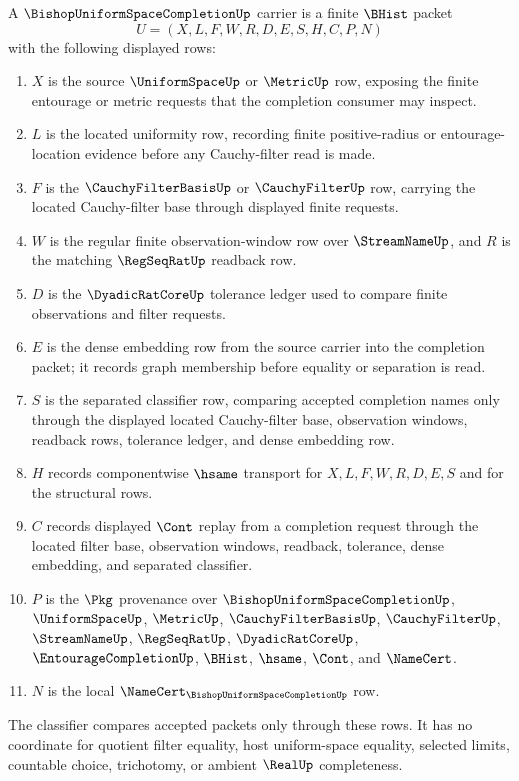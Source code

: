 \begin{definition}
\label{def:bishop-uniform-space-completion}
A $\BishopUniformSpaceCompletionUp$ carrier is a finite $\BHist$ packet
$$
U=(X,L,F,W,R,D,E,S,H,C,P,N)
$$
with the following displayed rows:
\begin{enumerate}
\item $X$ is the source $\UniformSpaceUp$ or $\MetricUp$ row, exposing the finite entourage or metric requests that the completion consumer may inspect.
\item $L$ is the located uniformity row, recording finite positive-radius or entourage-location evidence before any Cauchy-filter read is made.
\item $F$ is the $\CauchyFilterBasisUp$ or $\CauchyFilterUp$ row, carrying the located Cauchy-filter base through displayed finite requests.
\item $W$ is the regular finite observation-window row over $\StreamNameUp$, and $R$ is the matching $\RegSeqRatUp$ readback row.
\item $D$ is the $\DyadicRatCoreUp$ tolerance ledger used to compare finite observations and filter requests.
\item $E$ is the dense embedding row from the source carrier into the completion packet; it records graph membership before equality or separation is read.
\item $S$ is the separated classifier row, comparing accepted completion names only through the displayed located Cauchy-filter base, observation windows, readback rows, tolerance ledger, and dense embedding row.
\item $H$ records componentwise $\hsame$ transport for $X,L,F,W,R,D,E,S$ and for the structural rows.
\item $C$ records displayed $\Cont$ replay from a completion request through the located filter base, observation windows, readback, tolerance, dense embedding, and separated classifier.
\item $P$ is the $\Pkg$ provenance over $\BishopUniformSpaceCompletionUp$, $\UniformSpaceUp$, $\MetricUp$, $\CauchyFilterBasisUp$, $\CauchyFilterUp$, $\StreamNameUp$, $\RegSeqRatUp$, $\DyadicRatCoreUp$, $\EntourageCompletionUp$, $\BHist$, $\hsame$, $\Cont$, and $\NameCert$.
\item $N$ is the local $\NameCert_{\BishopUniformSpaceCompletionUp}$ row.
\end{enumerate}
The classifier compares accepted packets only through these rows. It has no coordinate for quotient filter equality, host uniform-space equality, selected limits, countable choice, trichotomy, or ambient $\RealUp$ completeness.
\end{definition}

